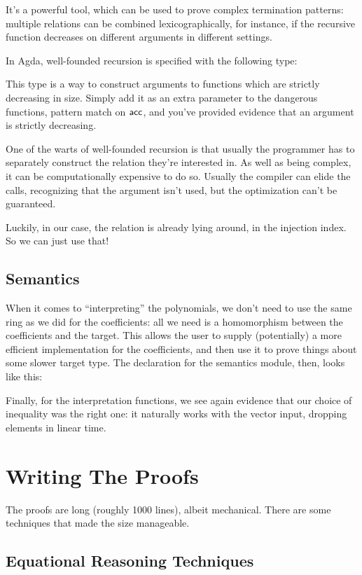 \documentclass[draft, twocolumn]{article}
\theoremstyle{definition}
\theoremstyle{remark}
\begin{document}
It's a powerful tool, which can be used to prove complex termination patterns:
multiple relations can be combined lexicographically, for instance, if the
recursive function decreases on different arguments in different settings.

In Agda,  well-founded recursion is specified with the following type:

This type is a way to construct arguments to functions which are strictly
decreasing in size. Simply add it as an extra parameter to the dangerous
functions, pattern match on \(\AgdaInductiveConstructor{acc}\), and you've
provided evidence that an argument is strictly decreasing.

One of the warts of well-founded recursion is that usually the programmer has to
separately construct the relation they're interested in. As well as being
complex, it can be computationally expensive to do so. Usually the compiler can
elide the calls, recognizing that the argument isn't used, but the optimization
can't be guaranteed.

Luckily, in our case, the relation is already lying around, in the injection
index. So we can just use that!

\subsection{Semantics}
When it comes to ``interpreting'' the polynomials, we don't need to use the same
ring as we did for the coefficients: all we need is a homomorphism between the
coefficients and the target. This allows the user to supply (potentially) a more
efficient implementation for the coefficients, and then use it to prove things
about some slower target type. The declaration for the semantics module, then,
looks like this:

Finally, for the interpretation functions, we see again evidence that our
choice of inequality was the right one: it naturally works with the vector
input, dropping elements in linear time.

\section{Writing The Proofs}
The proofs are long (roughly 1000 lines), albeit mechanical. There are some
techniques that made the size manageable.
\subsection{Equational Reasoning Techniques}
\end{document}
